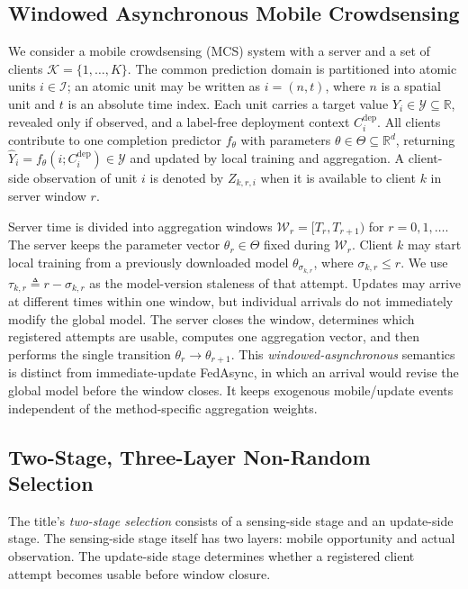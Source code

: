 \documentclass[letterpaper,journal]{IEEEtran}
\begin{document}
\subsection{Windowed Asynchronous Mobile Crowdsensing}
\label{subsec:windowed_mcs}

We consider a mobile crowdsensing (MCS) system with a server and a set of
clients $\mathcal{K}=\{1,\ldots,K\}$.  The common prediction domain is
partitioned into atomic units $i\in\mathcal{I}$; an atomic unit may be written as
$i=(n,t)$, where $n$ is a spatial unit and $t$ is an absolute time index.  Each
unit carries a target value $Y_i\in\mathcal{Y}\subseteq\mathbb{R}$, revealed only
if observed, and a label-free deployment context $C_i^{\mathrm{dep}}$.  All
clients contribute to one completion predictor $f_{\theta}$ with parameters
$\theta\in\Theta\subseteq\mathbb{R}^{d}$, returning
$\widehat Y_i=f_{\theta}(i;C_i^{\mathrm{dep}})\in\mathcal{Y}$ and updated by
local training and aggregation.
A client-side observation of unit $i$ is denoted by $Z_{k,r,i}$ when it is
available to client $k$ in server window $r$.

Server time is divided into aggregation windows
$\mathcal{W}_r=[T_r,T_{r+1})$ for $r=0,1,\ldots$.
The server keeps the parameter vector $\theta_r\in\Theta$ fixed during
$\mathcal{W}_r$.  Client $k$ may start local training from a previously
downloaded model $\theta_{\sigma_{k,r}}$,
where $\sigma_{k,r}\le r$.  We use
$\tau_{k,r}\triangleq r-\sigma_{k,r}$
as the model-version staleness of that attempt.  Updates may arrive at
different times within one window, but individual arrivals do not
immediately modify the global model.  The server closes the window,
determines which registered attempts are usable, computes one
aggregation vector, and then performs the single transition
$\theta_r\rightarrow\theta_{r+1}$.  This \emph{windowed-asynchronous}
semantics is distinct from immediate-update FedAsync, in which an
arrival would revise the global model before the window closes.  It
keeps exogenous mobile/update events independent of the method-specific
aggregation weights.

\subsection{Two-Stage, Three-Layer Non-Random Selection}
\label{subsec:selection_process}

The title's \emph{two-stage selection} consists of a sensing-side stage and an
update-side stage.  The sensing-side stage itself has two layers: mobile
opportunity and actual observation.  The update-side stage determines whether a
registered client attempt becomes usable before window closure.
\end{document}
